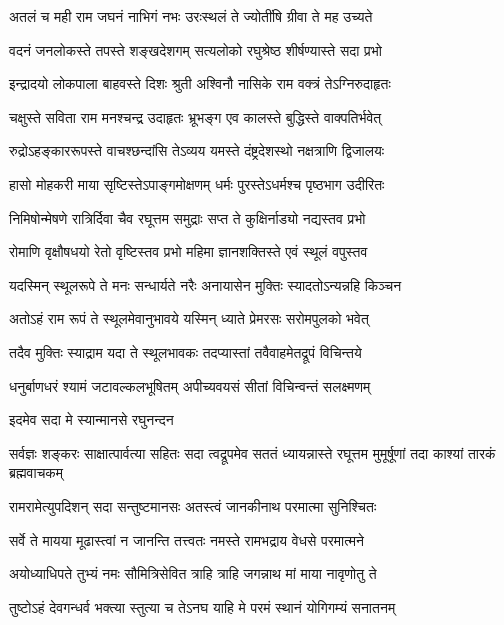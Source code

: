\twolineshloka
{अतलं च मही राम जघनं नाभिगं नभः}
{उरःस्थलं ते ज्योतींषि ग्रीवा ते मह उच्यते} %

\twolineshloka
{वदनं जनलोकस्ते तपस्ते शङ्खदेशगम्}
{सत्यलोको रघुश्रेष्ठ शीर्षण्यास्ते सदा प्रभो} %

\twolineshloka
{इन्द्रादयो लोकपाला बाहवस्ते दिशः श्रुती}
{अश्विनौ नासिके राम वक्त्रं तेऽग्निरुदाहृतः} %

\twolineshloka
{चक्षुस्ते सविता राम मनश्चन्द्र उदाहृतः}
{भ्रूभङ्ग एव कालस्ते बुद्धिस्ते वाक्पतिर्भवेत्} %

\twolineshloka
{रुद्रोऽहङ्काररूपस्ते वाचश्छन्दांसि तेऽव्यय}
{यमस्ते दंष्ट्रदेशस्थो नक्षत्राणि द्विजालयः} %

\twolineshloka
{हासो मोहकरी माया सृष्टिस्तेऽपाङ्गमोक्षणम्}
{धर्मः पुरस्तेऽधर्मश्च पृष्ठभाग उदीरितः} %

\twolineshloka
{निमिषोन्मेषणे रात्रिर्दिवा चैव रघूत्तम}
{समुद्राः सप्त ते कुक्षिर्नाड्यो नद्यस्तव प्रभो} %

\twolineshloka
{रोमाणि वृक्षौषधयो रेतो वृष्टिस्तव प्रभो}
{महिमा ज्ञानशक्तिस्ते एवं स्थूलं वपुस्तव} %

\twolineshloka
{यदस्मिन् स्थूलरूपे ते मनः सन्धार्यते नरैः}
{अनायासेन मुक्तिः स्यादतोऽन्यन्नहि किञ्चन} %

\twolineshloka
{अतोऽहं राम रूपं ते स्थूलमेवानुभावये}
{यस्मिन् ध्याते प्रेमरसः सरोमपुलको भवेत्} %

\twolineshloka
{तदैव मुक्तिः स्याद्राम यदा ते स्थूलभावकः}
{तदप्यास्तां तवैवाहमेतद्रूपं विचिन्तये} %

\twolineshloka
{धनुर्बाणधरं श्यामं जटावल्कलभूषितम्}
{अपीच्यवयसं सीतां विचिन्वन्तं सलक्ष्मणम्} %

\onelineshloka
{इदमेव सदा मे स्यान्मानसे रघुनन्दन} %


\threelineshloka
{सर्वज्ञः शङ्करः साक्षात्पार्वत्या सहितः सदा}
{त्वद्रूपमेव सततं ध्यायन्नास्ते रघूत्तम}
{मुमूर्षूणां तदा काश्यां तारकं ब्रह्मवाचकम्} %

\twolineshloka
{रामरामेत्युपदिशन् सदा सन्तुष्टमानसः}
{अतस्त्वं जानकीनाथ परमात्मा सुनिश्चितः} %

\twolineshloka
{सर्वे ते मायया मूढास्त्वां न जानन्ति तत्त्वतः}
{नमस्ते रामभद्राय वेधसे परमात्मने} %

\twolineshloka
{अयोध्याधिपते तुभ्यं नमः सौमित्रिसेवित}
{त्राहि त्राहि जगन्नाथ मां माया नावृणोतु ते} %


\twolineshloka
{तुष्टोऽहं देवगन्धर्व भक्त्या स्तुत्या च तेऽनघ}
{याहि मे परमं स्थानं योगिगम्यं सनातनम्} %

